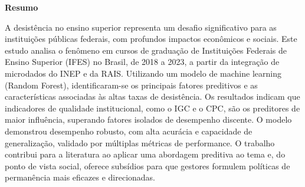 \makeatletter
\renewcommand{\bibsection}{%
  \addcontentsline{toc}{chapter}{Referências}%
  \vspace{2em}%
  \noindent\normalsize\textbf{Referências}%
  \vspace{1em}\par
    \normalsize %
}
\makeatother

\makeatletter
\renewcommand{\tableofcontents}{%
  \vspace{2em}%
  \noindent\normalsize\textbf{Sumário}%
  \vspace{1em}\par
  \normalsize
  \@starttoc{toc}%
}
\makeatother


\newcommand{\espacoentreparagrafos}{
  \par\vspace{0.5cm}\noindent\hspace{1.25cm}
}








\thispagestyle{empty} %

\noindent
\textbf{Resumo}

\vspace{1em} %

\noindent
A desistência no ensino superior representa um desafio significativo para as instituições públicas federais, com profundos impactos econômicos e sociais. Este estudo analisa o fenômeno em cursos de graduação de Instituições Federais de Ensino Superior (IFES) no Brasil, de 2018 a 2023, a partir da integração de microdados do INEP e da RAIS. Utilizando um modelo de machine learning (Random Forest), identificaram-se os principais fatores preditivos e as características associadas às altas taxas de desistência. Os resultados indicam que indicadores de qualidade institucional, como o IGC e o CPC, são os preditores de maior influência, superando fatores isolados de desempenho discente. O modelo demonstrou desempenho robusto, com alta acurácia e capacidade de generalização, validado por múltiplas métricas de performance. O trabalho contribui para a literatura ao aplicar uma abordagem preditiva ao tema e, do ponto de vista social, oferece subsídios para que gestores formulem políticas de permanência mais eficazes e direcionadas.

